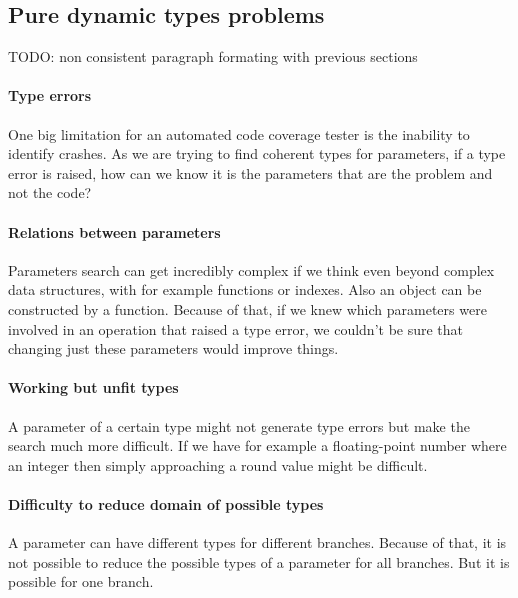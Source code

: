 \documentclass{llncs2e/llncs}
\makeatletter
\def\todo#1{{\color{red}TODO\@: #1}}
\makeatother
\begin{document}
\subsection{Pure dynamic types problems}
\todo{non consistent paragraph formating with previous sections}
\paragraph{Type errors} One big limitation for an automated code coverage tester
is the inability to identify crashes. As we are trying to find coherent types
for parameters, if a type error is raised, how can we know it is the parameters
that are the problem and not the code?

\paragraph{Relations between parameters} Parameters search can get incredibly
complex if we think even beyond complex data structures, with for example
functions or indexes. Also an object can be constructed by a function. Because
of that, if we knew which parameters were involved in an operation that raised a
type error, we couldn't be sure that changing just these parameters would
improve things.

\paragraph{Working but unfit types} A parameter of a certain type might not
generate type errors but make the search much more difficult. If we have for
example a floating-point number where an integer then simply approaching a round
value might be difficult.


\paragraph{Difficulty to reduce domain of possible types} A parameter can have
different types for different branches. Because of that, it is not possible to
reduce the possible types of a parameter for all branches. But it is possible
for one branch.
\end{document}
